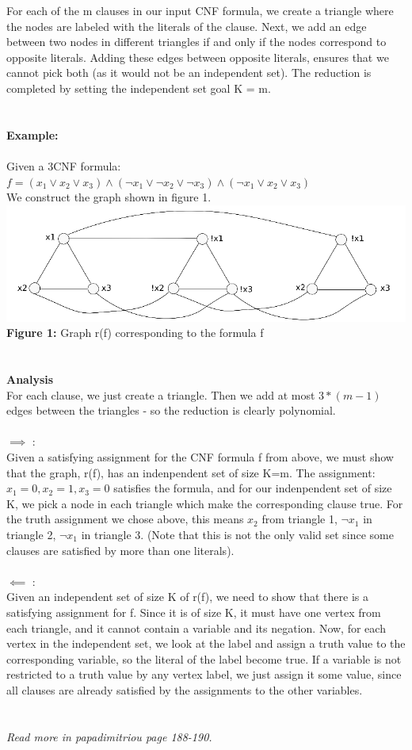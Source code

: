 \documentclass{article}
\begin{document}
For each of the m clauses in our input CNF formula, we create a triangle where the nodes are labeled with the literals of the clause. Next, we add an edge between two nodes in different triangles if and only if the nodes correspond to opposite literals. Adding these edges between opposite literals, ensures that we cannot pick both (as it would not be an independent set). The reduction is completed by setting the independent set goal K = m. \\\\\\
\textbf{Example:}\\\\
Given a 3CNF formula:  $f =  (x_1 \lor x_2 \lor x_3) \land (\lnot x_1 \lor \lnot x_2 \lor \lnot x_3) \land (\lnot x_1 \lor x_2 \lor x_3)$\\
We construct the graph shown in figure 1. \\
\includegraphics[scale=0.5]{independentset}
\textbf{Figure 1:} Graph r(f) corresponding to the formula f\\\\\\
\textbf{Analysis}\\
For each clause, we just create a triangle. Then we add at most $3 * (m-1)$ edges between the triangles - so the reduction is clearly polynomial.
\\\\
$\implies$ :\\ Given a satisfying assignment for the CNF formula f from above, we must show that the graph, r(f), has an indenpendent set of size K=m. The assignment: $x_1 = 0, x_2 = 1, x_3 = 0$ satisfies the formula, and for our indenpendent set of size K, we pick a node in each triangle which make the corresponding clause true. For the truth assignment we chose above, this means $x_2$ from triangle 1, $\lnot x_1$ in triangle 2, $\lnot x_1$ in triangle 3. (Note that this is not the only valid set since some clauses are satisfied by more than one literals).
\\\\
$\impliedby$ :\\ Given an independent set of size K of r(f), we need to show that there is a satisfying assignment for f. Since it is of size K, it must have one vertex from each triangle, and it cannot contain a variable and its negation. Now, for each vertex in the independent set, we look at the label and assign a truth value to the corresponding variable, so the literal of the label become true. If a variable is not restricted to a truth value by any vertex label, we just assign it some value, since all clauses are already satisfied by the assignments to the other variables.\\\\\\
\textit{Read more in papadimitriou page 188-190.}
\newpage
\end{document}
